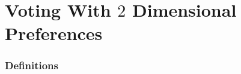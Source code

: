 \documentclass[12pt]{article}
\newcommand{\1}[1]{\mathds{1}[{#1}]}
\begin{document}

















\clearpage
\part{Voting With $2$ Dimensional Preferences}

\section{Definitions}
\end{document}
